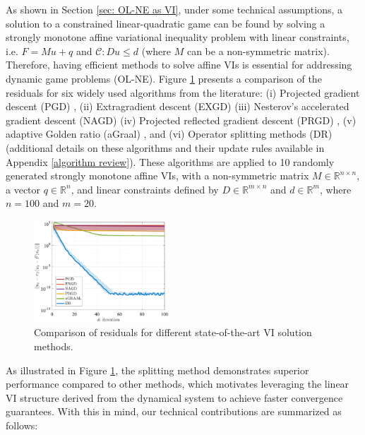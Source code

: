 \documentclass[letterpaper, 10 pt, conference]{ieeeconf}  %
\begin{document}
As shown in Section \ref{sec: OL-NE as VI}, {under some technical assumptions, a solution to a constrained linear-quadratic game can be found by solving a strongly monotone affine variational inequality problem} with linear constraints, i.e. $F = Mu + q$ and $\mathcal{C}: Du \leq d$ (where $M$ can be a non-symmetric matrix). Therefore, having efficient methods to solve affine VIs is essential for addressing dynamic game problems (OL-NE). Figure \ref{fig1} presents a comparison of the residuals for six widely used algorithms from the literature: (i) Projected gradient descent (PGD) \cite{nemirovskij1983problem}, (ii) Extragradient descent (EXGD) \cite{malitsky2014extragradient} (iii) Nesterov's accelerated gradient descent (NAGD) \cite{nesterov2006solving} (iv) Projected reflected gradient descent (PRGD) \cite{malitsky2015projected}, (v) adaptive Golden ratio (aGraal) \cite{malitsky2020golden}, and (vi) Operator splitting methods (DR) \cite{facchinei2003finite} (additional details on these algorithms and their update rules available in Appendix \ref{algorithm review}). These algorithms are applied to 10 randomly generated strongly monotone affine VIs, with a non-symmetric matrix $M \in \mathbb{R}^{n \times n}$, a vector $q \in \mathbb{R}^n$, and linear constraints defined by $D \in \mathbb{R}^{m \times n}$ and $d \in \mathbb{R}^{m}$, where $n = 100$ and $m = 20$.\\
\begin{figure}[!h]
     \centering
           \includegraphics[width=0.45\textwidth]{VImethods.eps}
           \caption{Comparison of residuals for different state-of-the-art VI solution methods.} 
           \label{fig1}
\end{figure}
As illustrated in Figure \ref{fig1}, the splitting method demonstrates superior performance compared to other methods, which motivates leveraging the linear VI structure derived from the dynamical system to achieve faster convergence guarantees. With this in mind, our technical contributions are summarized as follows:
\end{document}
